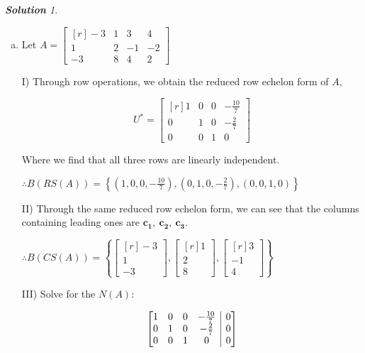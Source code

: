 \documentclass[12pt, letterpaper]{article}
\makeatletter
\theoremstyle{remark}
\theoremstyle{remark}
\newtheorem*{solution}{\textbf{Solution}}
\newenvironment{amatrix}[1]{%
    \left[\begin{array}{@{}*{#1}{c}|c@{}}
    }{%
        \end{array}\right]
    }
\makeatother
\begin{document}
\begin{solution}
\begin{enumerate}[(a)]
		      \pagebreak

		\item Let \( A =
		      \begin{bmatrix*}[r]
			      −3 & 1 & 3 & 4 \\
			      1 & 2 & −1 & −2 \\
			      −3 & 8 & 4 & 2
		      \end{bmatrix*}
		      \)

		      I) Through row operations, we obtain the reduced row echelon
		      form of \(A\),

		      \[U^* = \begin{bmatrix*}[r]
				      1 & 0 & 0 & -\frac{10}{7} \\
				      0 & 1 & 0 & -\frac{2}{7} \\
				      0 & 0 & 1 & 0
			      \end{bmatrix*}\]

		      Where we find that all three rows are linearly independent.

		      \(\therefore B(RS(A)) = \left\{(1, 0, 0, -\frac{10}{7}), (0, 1, 0, -\frac{2}{7}), (0, 0, 1, 0)\right\}\)

		      \bigskip

		      II) Through the same reduced row echelon form, we can see
		      that the columns containing leading ones are \(\bm{c_1},\ \bm{c_2},\ \bm{c_3}\).

		      \(\therefore B(CS(A)) = \left\{\begin{bmatrix*}[r]
			      -3 \\
			      1 \\
			      -3
		      \end{bmatrix*},
		      \begin{bmatrix*}[r]
			      1 \\
			      2 \\
			      8
		      \end{bmatrix*},
		      \begin{bmatrix*}[r]
			      3 \\
			      -1 \\
			      4
		      \end{bmatrix*}\right\}\)

		      \bigskip

		      III) Solve for the \(N(A)\):

		      \[\begin{amatrix}{4}
				      1 & 0 & 0 & -\frac{10}{7} & 0 \\
				      0 & 1 & 0 & -\frac{2}{7} & 0 \\
				      0 & 0 & 1 & 0 & 0
			      \end{amatrix}\]


\end{enumerate}
\end{solution}
\end{document}
